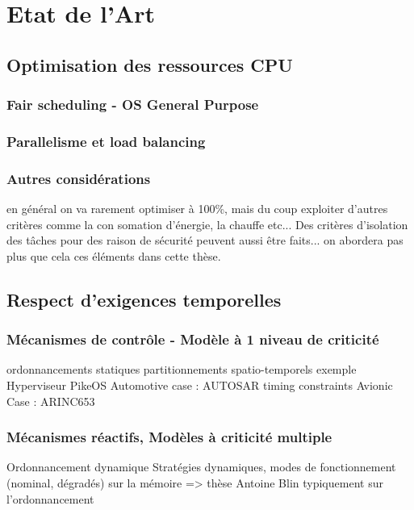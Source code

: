 \documentclass[a4paper,11pt,twoside]{StyleThese}
\begin{document}
\setcounter{chapter}{2} %
\dominitoc
\faketableofcontents
\fi

\chapter{Etat de l'Art}
\minitoc

\section{Optimisation des ressources CPU}
    \subsection{Fair scheduling - OS General Purpose}
    \subsection{Parallelisme et load balancing}
    \subsection{Autres considérations}
        en général on va rarement optimiser à 100\%, mais du coup exploiter d'autres critères comme la con somation d'énergie, la chauffe etc... Des critères d'isolation des tâches pour des raison de sécurité peuvent aussi être faits... on abordera pas plus que cela ces éléments dans cette thèse.
\section{Respect d'exigences temporelles}
    \subsection{Mécanismes de contrôle - Modèle à 1 niveau de criticité}
        ordonnancements statiques
        partitionnements spatio-temporels
            exemple Hyperviseur PikeOS
        Automotive case : AUTOSAR
            timing constraints
        Avionic Case : ARINC653
    \subsection{Mécanismes réactifs, Modèles à criticité multiple}
        Ordonnancement dynamique
        Stratégies dynamiques, modes de fonctionnement (nominal, dégradés)
            sur la mémoire => thèse Antoine Blin typiquement
            sur l'ordonnancement

\ifdefined{}
\else


\end{document}
